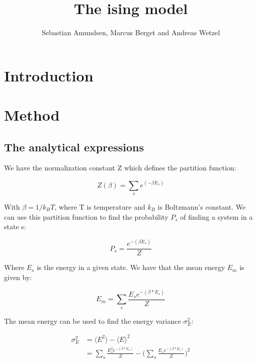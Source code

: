 \documentclass{article}
\begin{document}
\title{The ising model}
\author{Sebastian Amundsen, Marcus Berget and Andreas Wetzel}

\maketitle

\begin{abstract}

\end{abstract}

\begin{multicols}{2}

\section{Introduction}

\section{Method}

\subsection*{The analytical expressions}

We have the normalization constant Z which defines the partition function:

\begin{equation}
Z(\beta) = \sum_{s} e^{(-\beta E_s)}
\label{eq:Z}
\end{equation}

With $\beta=1/k_BT$, where T is temperature and $k_B$ is Boltzmann's constant. We can use this partition function to find the probability $P_s$ of finding a system in a state s:

\begin{equation}
P_s=\frac{e^{-(\beta E_s)}}{Z}
\label{eq:P_s}
\end{equation}

Where $E_s$ is the energy in a given state. We have that the mean energy $E_m$ is given by:

\begin{equation}
E_m = \sum_s \frac{E_s e^{-(\beta*E_s)}}{Z}
\label{eq:E_m}
\end{equation}

The mean energy can be used to find the energy variance $\sigma_E^2$:

\begin{equation}
\begin{split}
\sigma_E^2 &= \langle E^2 \rangle - \langle E \rangle^2 \\
&= \sum_s \frac{E_s^2 e^{-(\beta*E_s)}}{Z} - \bigg(\sum_s \frac{E_s e^{-(\beta*E_s)}}{Z}\bigg)^2
\end{split}
\label{eq:E_v}
\end{equation}


\end{multicols}
\end{document}
